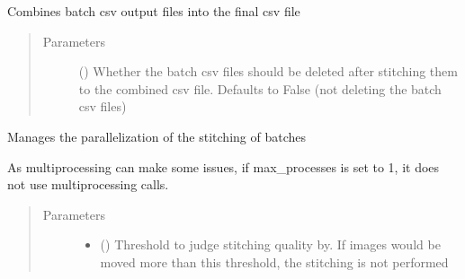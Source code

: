 \documentclass[letterpaper,10pt,english]{sphinxmanual}
\begin{document}
\begin{fulllineitems}
\begin{fulllineitems}
\begin{quote}
\begin{description}
\end{description}\end{quote}

\end{fulllineitems}


\begin{fulllineitems}
\label{\detokenize{index:stitch_MAPS_annotations.Stitcher.combine_csvs}}
Combines batch csv output files into the final csv file
\begin{quote}\begin{description}
\item[{Parameters}] \leavevmode
{} () \textendash{} Whether the batch csv files should be deleted after stitching them to the combined
csv file. Defaults to False (not deleting the batch csv files)

\end{description}\end{quote}

\end{fulllineitems}


\begin{fulllineitems}
\label{\detokenize{index:stitch_MAPS_annotations.Stitcher.manage_batches}}
Manages the parallelization of the stitching of batches

As multiprocessing can make some issues, if max\_processes is set to 1, it does not use multiprocessing calls.
\begin{quote}\begin{description}
\item[{Parameters}] \leavevmode\begin{itemize}
\item {} 
 () \textendash{} Threshold to judge stitching quality by. If images would be moved more than this
threshold, the stitching is not performed


\end{itemize}
\end{description}
\end{quote}
\end{fulllineitems}
\end{fulllineitems}
\end{document}
